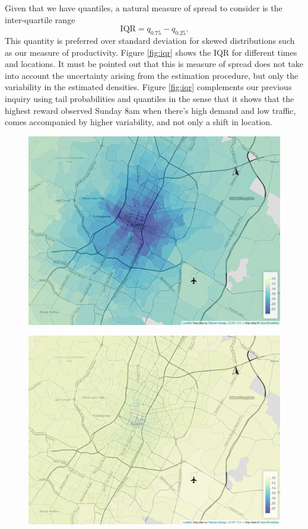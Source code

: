 \documentclass[11pt]{article}
\begin{document}
Given that we have quantiles, a natural measure of spread to consider is the inter-quartile range
$$
\text{IQR} = q_{0.75} - q_{0.25}.
$$
This quantity is preferred over standard deviation for skewed distributions such as our measure of productivity. Figure \ref{fig:iqr} shows the IQR for different times and locations. It must be pointed out that this is measure of spread does not take into account the uncertainty arising from the estimation procedure, but only the variability in the estimated densities. Figure \ref{fig:iqr} complements our previous inquiry using tail probabilities and quantiles in the sense that it shows that the highest reward observed Sunday 8am when there's high demand and low traffic, comes accompanied by higher variability, and not only a shift in location.

\begin{figure}[htb]
    \centering
    \begin{minipage}[t]{0.48\linewidth}
        \centering
        \includegraphics[width=\linewidth]{img/quantile_9_1.png}
        \label{fig:iqr:a}
    \end{minipage}
    \begin{minipage}[t]{0.48\linewidth}
        \centering
        \includegraphics[width=\linewidth]{img/quantile_43_1.png}

\end{minipage}
\end{figure}
\end{document}
